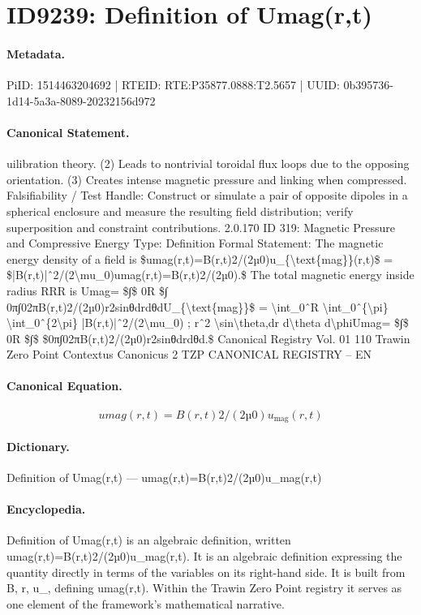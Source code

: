 \section*{ID9239: Definition of Umag(r,t)}
\paragraph{Metadata.}
PiID: 1514463204692 | RTEID: RTE:P35877.0888:T2.5657 | UUID: 0b395736-1d14-5a3a-8089-20232156d972

\paragraph{Canonical Statement.}
uilibration theory. (2) Leads to nontrivial toroidal flux loops due to the opposing orientation. (3) Creates intense magnetic pressure and linking when compressed. Falsifiability / Test Handle: Construct or simulate a pair of opposite dipoles in a spherical enclosure and measure the resulting field distribution; verify superposition and constraint contributions. 2.0.170 ID 319: Magnetic Pressure and Compressive Energy Type: Definition Formal Statement: The magnetic energy density of a field is \$umag(r,t)=B(r,t)2/(2µ0)u\_\{\textbackslash{}text\{mag\}\}(r,t)\$ = \$|B(r,t)|ˆ2/(2\textbackslash{}mu\_0)umag(r,t)=B(r,t)2/(2µ0).\$ The total magnetic energy inside radius RRR is Umag= \$∫\$ 0R \$∫ 0π∫02πB(r,t)2/(2µ0)r2sinθdrdθdU\_\{\textbackslash{}text\{mag\}\}\$ = \textbackslash{}int\_0ˆR \textbackslash{}int\_0ˆ\{\textbackslash{}pi\} \textbackslash{}int\_0ˆ\{2\textbackslash{}pi\} |B(r,t)|ˆ2/(2\textbackslash{}mu\_0) ; rˆ2 \textbackslash{}sin\textbackslash{}theta,dr d\textbackslash{}theta d\textbackslash{}phiUmag= \$∫\$ 0R \$∫\$ \$0π∫02πB(r,t)2/(2µ0)r2sinθdrdθd.\$ Canonical Registry Vol. 01 110 Trawin Zero Point Contextus Canonicus 2 TZP CANONICAL REGISTRY – EN

\paragraph{Canonical Equation.}
\[
umag(r,t)=B(r,t)2/(2µ0)u_{\text{mag}}(r,t)
\]

\paragraph{Dictionary.}
Definition of Umag(r,t) — umag(r,t)=B(r,t)2/(2µ0)u\_mag(r,t)

\paragraph{Encyclopedia.}
Definition of Umag(r,t) is an algebraic definition, written umag(r,t)=B(r,t)2/(2µ0)u\_mag(r,t). It is an algebraic definition expressing the quantity directly in terms of the variables on its right-hand side. It is built from B, r, u\_, defining umag(r,t). Within the Trawin Zero Point registry it serves as one element of the framework's mathematical narrative.
